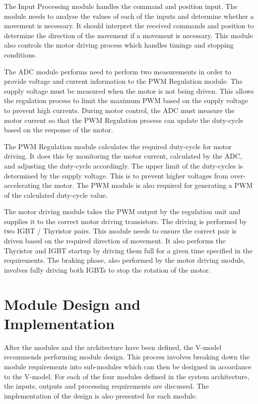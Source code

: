 The Input Processing module handles the command and position input. The module needs to analyse the values of each of the inputs and determine whether a movement is necessary. It should interpret the received commands and position to determine the direction of the movement if a movement is necessary. This module also controls the motor driving process which handles timings and stopping conditions.

The ADC module performs need to perform two measurements in order to provide voltage and current information to the PWM Regulation module. The supply voltage must be measured when the motor is not being driven. This allows the regulation process to limit the maximum PWM based on the supply voltage to prevent high currents. During motor control, the ADC must measure the motor current so that the PWM Regulation process can update the duty-cycle based on the response of the motor.

The PWM Regulation module calculates the required duty-cycle for motor driving. It does this by monitoring the motor current, calculated by the ADC, and adjusting the duty-cycle accordingly. The upper limit of the duty-cycles is determined by the supply voltage. This is to prevent higher voltages from over-accelerating the motor. The PWM module is also required for generating a PWM of the calculated duty-cycle value.

The motor driving module takes the PWM output by the regulation unit and supplies it to the correct motor driving transistors. The driving is performed by two IGBT / Thyristor pairs. This module needs to ensure the correct pair is driven based on the required direction of movement. It also performs the Thyristor and IGBT startup by driving them full for a given time specified in the requirements. The braking phase, also performed by the motor driving module, involves fully driving both IGBTs to stop the rotation of the motor. 





\section{Module Design and Implementation}

After the modules and the architecture have been defined, the V-model recommends performing module design. This process involves breaking down the module requirements into sub-modules which can then be designed in accordance to the V-model. For each of the four modules defined in the system architecture, the inputs, outputs and processing requirements are discussed. The implementation of the design is also presented for each module.

